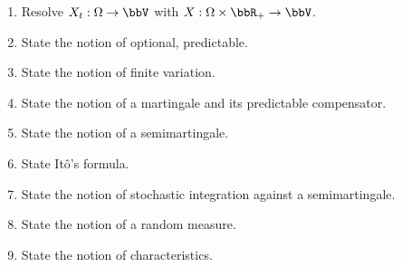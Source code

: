 \begin{enumerate}
  \item
    Resolve $\X_t: \Omega \rightarrow \vecSpace$ with $\X: \Omega \times \bbR_+ \rightarrow \vecSpace$.
  \item
    State the notion of optional, predictable.
  \item
    State the notion of finite variation.
  \item
    State the notion of a martingale and its predictable compensator.
  \item
    State the notion of a semimartingale.
  \item
    State It\^o's formula.
  \item
    State the notion of stochastic integration against a semimartingale.
  \item
    State the notion of a random measure.
  \item
    State the notion of characteristics.
\end{enumerate}
